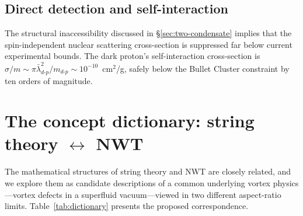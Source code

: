 \documentclass[11pt]{article}
\providecommand{\lambdabar}{\bar{\lambda}}
\begin{document}
\subsection{Direct detection and self-interaction}

The structural inaccessibility discussed in \S\ref{sec:two-condensate} implies that the spin-independent nuclear scattering cross-section is suppressed far below current experimental bounds.
The dark proton's self-interaction cross-section is $\sigma/m \sim \pi\lambdabar_{d\text{-}p}^2/m_{d\text{-}p} \sim 10^{-10}$~cm$^2$/g, safely below the Bullet Cluster constraint by ten orders of magnitude.

\section{The concept dictionary: string theory $\leftrightarrow$ NWT}
\label{sec:dictionary}

The mathematical structures of string theory and NWT are closely related, and we explore them as candidate descriptions of a common underlying vortex physics---vortex defects in a superfluid vacuum---viewed in two different aspect-ratio limits.
Table~\ref{tab:dictionary} presents the proposed correspondence.
\end{document}
